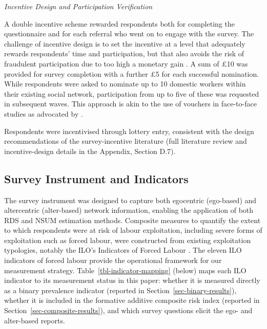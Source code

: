 \documentclass[
  12pt,
  letterpaper,
  DIV=11,
  numbers=noendperiod]{scrartcl}
\begin{document}
\emph{Incentive Design and Participation Verification}

A double incentive scheme rewarded respondents both for completing the
questionnaire and for each referral who went on to engage with the
survey. The challenge of incentive design is to set the incentive at a
level that adequately rewards respondents' time and participation, but
that also avoids the risk of fraudulent participation due to too high a
monetary gain \autocite{jord20-overcoming}. A sum of £10 was provided
for survey completion with a further £5 for each successful nomination.
While respondents were asked to nominate up to 10 domestic workers
within their existing social network, participation from up to five of
these was requested in subsequent waves. This approach is akin to the
use of vouchers in face-to-face studies as advocated by
\textcite{thompson_new_2020}.

Respondents were incentivised through lottery entry, consistent with the
design recommendations of the survey-incentive literature (full
literature review and incentive-design details in the Appendix, Section
D.7).

\subsection{Survey Instrument and
Indicators}\label{sec-survey-instrument}

The survey instrument was designed to capture both egocentric
(ego-based) and altercentric (alter-based) network information, enabling
the application of both RDS and NSUM estimation methods. Composite
measures to quantify the extent to which respondents were at risk of
labour exploitation, including severe forms of exploitation such as
forced labour, were constructed from existing exploitation typologies,
notably the ILO's Indicators of Forced Labour
\autocite{ILO11-indicators}. The eleven ILO indicators of forced labour
\autocite{ILO11-indicators,international_labour_organization_global_2017}
provide the operational framework for our measurement strategy.
Table~\ref{tbl-indicator-mapping} (below) maps each ILO indicator to its
measurement status in this paper: whether it is measured directly as a
binary prevalence indicator (reported in
Section~\ref{sec-binary-results}), whether it is included in the
formative additive composite risk index (reported in
Section~\ref{sec-composite-results}), and which survey questions elicit
the ego- and alter-based reports.
\end{document}
